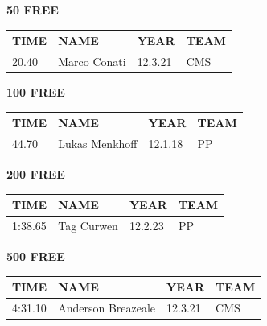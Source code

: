 \begin{table}[H]
\centering
\begin{minipage}[t]{0.48\textwidth}
\centering
\textbf{50 FREE}\\[0.1cm]
\begin{tabular}{@{}p{1.8cm}p{2.8cm}p{1.2cm}p{1.4cm}@{}}
\hline
    \textbf{TIME} & \textbf{NAME} & \textbf{YEAR} & \textbf{TEAM} \\
\hline
    20.40 & Marco Conati & 12.3.21 & CMS \\
\hline
\end{tabular}
\end{minipage}\hfill
\begin{minipage}[t]{0.48\textwidth}
\centering
\textbf{100 FREE}\\[0.1cm]
\begin{tabular}{@{}p{1.8cm}p{2.8cm}p{1.2cm}p{1.4cm}@{}}
\hline
    \textbf{TIME} & \textbf{NAME} & \textbf{YEAR} & \textbf{TEAM} \\
\hline
    44.70 & Lukas Menkhoff & 12.1.18 & PP \\
\hline
\end{tabular}
\end{minipage}
\end{table}

\begin{table}[H]
\centering
\begin{minipage}[t]{0.48\textwidth}
\centering
\textbf{200 FREE}\\[0.1cm]
\begin{tabular}{@{}p{1.8cm}p{2.8cm}p{1.2cm}p{1.4cm}@{}}
\hline
    \textbf{TIME} & \textbf{NAME} & \textbf{YEAR} & \textbf{TEAM} \\
\hline
    1:38.65 & Tag Curwen & 12.2.23 & PP \\
\hline
\end{tabular}
\end{minipage}\hfill
\begin{minipage}[t]{0.48\textwidth}
\centering
\textbf{500 FREE}\\[0.1cm]
\begin{tabular}{@{}p{1.8cm}p{2.8cm}p{1.2cm}p{1.4cm}@{}}
\hline
    \textbf{TIME} & \textbf{NAME} & \textbf{YEAR} & \textbf{TEAM} \\
\hline
    4:31.10 & Anderson Breazeale & 12.3.21 & CMS \\
\hline
\end{tabular}
\end{minipage}
\end{table}

